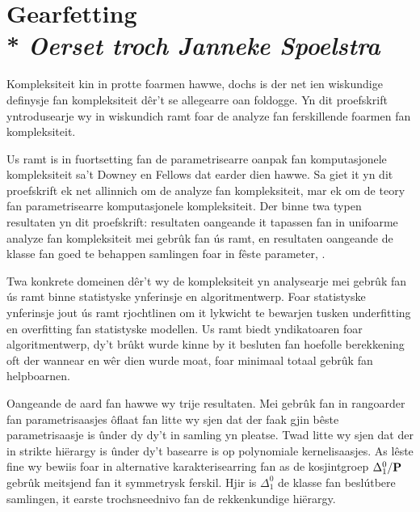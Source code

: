 {\begin{otherlanguage}{westernfrisian}
\chapter*{Gearfetting \\*
  \hspace*{\fill} \normalsize \mdseries \slshape Oerset troch Janneke Spoelstra
  \vspace{-\baselineskip}
}

Kompleksiteit kin in protte foarmen hawwe, dochs is der net ien wiskundige definysje fan kompleksiteit d{\^e}r't se allegearre oan foldogge.
Yn dit proefskrift yntrodusearje wy in wiskundich ramt foar de analyze fan ferskillende foarmen fan kompleksiteit.

Us ramt is in fuortsetting fan de parametrisearre oanpak fan komputasjonele kompleksiteit sa't Downey en Fellows dat earder dien hawwe.
Sa giet it yn dit proefskrift ek net allinnich om de analyze fan kompleksiteit, mar ek om de teory fan parametrisearre komputasjonele kompleksiteit.
Der binne twa typen resultaten yn dit proefskrift: resultaten oangeande it tapassen fan in unifoarme analyze fan kompleksiteit mei gebr{\^u}k fan {\'u}s ramt, en resultaten oangeande de klasse fan goed te behappen samlingen foar in f{\^e}ste parameter, .

Twa konkrete domeinen d{\^e}r't wy de kompleksiteit yn analysearje mei gebr{\^u}k fan {\'u}s ramt binne statistyske ynferinsje en algoritmentwerp.
Foar statistyske ynferinsje jout {\'u}s ramt rjochtlinen om it lykwicht te bewarjen tusken underfitting en overfitting fan statistyske modellen.
Us ramt biedt yndikatoaren foar algoritmentwerp, dy't br{\^u}kt wurde kinne by it besluten fan hoefolle berekkening oft der wannear en w{\^e}r dien wurde moat, foar minimaal totaal gebr{\^u}k fan helpboarnen.

Oangeande de aard fan  hawwe wy trije resultaten.
Mei gebr{\^u}k fan in rangoarder fan parametrisaasjes {\^o}flaat fan  litte wy sjen dat der faak gjin b{\^e}ste parametrisaasje is {\^u}nder dy dy't in samling yn  pleatse.
Twad litte wy sjen dat der in strikte hi{\"e}rargy is {\^u}nder  dy't basearre is op polynomiale kernelisaasjes.
As l{\^e}ste fine wy bewiis foar in alternative karakterisearring fan  as de kosjintgroep $\Delta^0_1 / \textnormal{\textbf{P}}$ gebr{\^u}k meitsjend fan it symmetrysk ferskil.
Hjir is $\Delta^0_1$ de klasse fan besl{\'u}tbere samlingen, it earste trochsneednivo fan de rekkenkundige hi{\"e}rargy.

\end{otherlanguage}}
